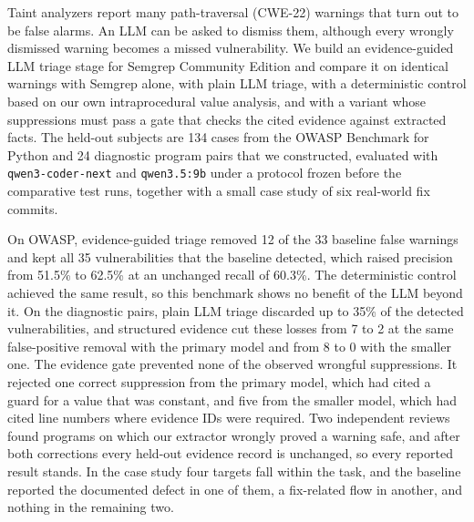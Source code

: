 Taint analyzers report many path-traversal (CWE-22) warnings that turn out to be false alarms. An LLM can be asked to dismiss them, although every wrongly dismissed warning becomes a missed vulnerability. We build an evidence-guided LLM triage stage for Semgrep Community Edition and compare it on identical warnings with Semgrep alone, with plain LLM triage, with a deterministic control based on our own intraprocedural value analysis, and with a variant whose suppressions must pass a gate that checks the cited evidence against extracted facts. The held-out subjects are 134 cases from the OWASP Benchmark for Python and 24 diagnostic program pairs that we constructed, evaluated with \texttt{qwen3-coder-next} and \texttt{qwen3.5:9b} under a protocol frozen before the comparative test runs, together with a small case study of six real-world fix commits.

On OWASP, evidence-guided triage removed 12 of the 33 baseline false warnings and kept all 35 vulnerabilities that the baseline detected, which raised precision from 51.5\% to 62.5\% at an unchanged recall of 60.3\%. The deterministic control achieved the same result, so this benchmark shows no benefit of the LLM beyond it. On the diagnostic pairs, plain LLM triage discarded up to 35\% of the detected vulnerabilities, and structured evidence cut these losses from 7 to 2 at the same false-positive removal with the primary model and from 8 to 0 with the smaller one. The evidence gate prevented none of the observed wrongful suppressions. It rejected one correct suppression from the primary model, which had cited a guard for a value that was constant, and five from the smaller model, which had cited line numbers where evidence IDs were required. Two independent reviews found programs on which our extractor wrongly proved a warning safe, and after both corrections every held-out evidence record is unchanged, so every reported result stands. In the case study four targets fall within the task, and the baseline reported the documented defect in one of them, a fix-related flow in another, and nothing in the remaining two.
